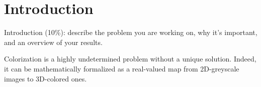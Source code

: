 \section{Introduction}
Introduction (10\%): describe the problem you are working on, why it's important, and an overview of your results.

Colorization is a highly undetermined problem without a unique solution. Indeed, it can be mathematically formalized as a real-valued map from 2D-greyscale images to 3D-colored ones.